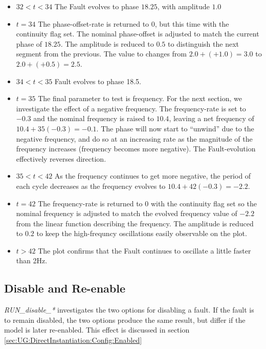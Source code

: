 \documentclass[11pt,fleqn]{report}
\begin{document}
\begin{itemize}
       The amplitude is set back to $1.0$ to distinguish the next segment
       from the previous, causing the value to change from $2.0 + (1.5) =
       3.5$ to $2.0 + (+1.0) = 3.0$.
 \item $32<t<34$ The Fault evolves to phase $18.25$, with amplitude $1.0$
 \item $t=34$ The phase-offset-rate is returned to 0, but this time with the
       continuity flag set. The nominal phase-offset is adjusted to match
       the current phase of $18.25$. The amplitude is reduced to $0.5$
       to distinguish the next segment from the previous.
       The value to changes from $2.0 + (+1.0) = 3.0$ to $2.0 + (+0.5) = 2.5$.
 \item $34<t<35$ Fault evolves to phase 18.5.
 \item $t=35$ The final parameter to test is frequency. For the next section,
       we investigate the effect of a negative frequency. The frequency-rate
       is set to $-0.3$ and the nominal frequency is raised to $10.4$,
       leaving a net frequency of $10.4 + 35(-0.3) = -0.1$.
       The phase will now start to ``unwind'' due to the negative frequency,
       and do so at an increasing rate as the magnitude of the frequency
       increases (frequency becomes more negative). The Fault-evolution
       effectively reverses direction.
 \item $35<t<42$ As the frequency continues to get more negative, the period of
       each cycle decreases as the frequency evolves to $10.4 + 42(-0.3) =
       -2.2$.
 \item $t=42$ The frequency-rate is returned to 0 with the continuity flag set
       so the nominal frequency is adjusted to match the evolved frequency
       value of $-2.2$ from the linear function describing the frequency. The
       amplitude is reduced to $0.2$ to keep the high-frequncy oscillations
       easily observable on the plot.
 \item $t>42$ The plot confirms that the Fault continues to oscillate a little
       faster than 2Hz.
\end{itemize}


\clearpage


\subsection {Disable and Re-enable} \label{sec:verif:DI:disable}
\textit{RUN\_disable\_*} investigates the two options for disabling a fault. If
the fault is to remain disabled, the two options produce the same result, but
differ if the model is later re-enabled. This effect is discussed in section
\ref{sec:UG:DirectInstantiation:Config:Enabled}
\end{document}
